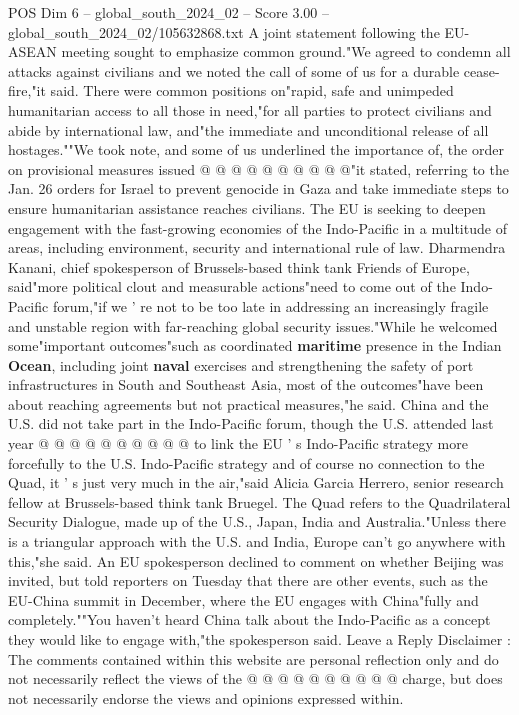 \begin{textsample}{POS Dim 6 – global\_south\_2024\_02 – Score 3.00 – global\_south\_2024\_02/105632868.txt}
A joint statement following the EU-ASEAN meeting sought to emphasize common ground."We agreed to condemn all attacks against civilians and we noted the call of some of us for a durable cease-fire,"it said.
There were common positions on"rapid, safe and unimpeded humanitarian access to all those in need,"for all parties to protect civilians and abide by international law, and"the immediate and unconditional release of all hostages.""We took note, and some of us underlined the importance of, the order on provisional measures issued @ @ @ @ @ @ @ @ @ @"it stated, referring to the Jan. 26 orders for Israel to prevent genocide in Gaza and take immediate steps to ensure humanitarian assistance reaches civilians.
The EU is seeking to deepen engagement with the fast-growing economies of the Indo-Pacific in a multitude of areas, including environment, security and international rule of law.
Dharmendra Kanani, chief spokesperson of Brussels-based think tank Friends of Europe, said"more political clout and measurable actions"need to come out of the Indo-Pacific forum,"if we ' re not to be too late in addressing an increasingly fragile and unstable region with far-reaching global security issues."While he welcomed some"important outcomes"such as coordinated \textbf{maritime} presence in the Indian \textbf{Ocean}, including joint \textbf{naval} exercises and strengthening the safety of port infrastructures in South and Southeast Asia, most of the outcomes"have been about reaching agreements but not practical measures,"he said.
China and the U.S. did not take part in the Indo-Pacific forum, though the U.S. attended last year @ @ @ @ @ @ @ @ @ @ to link the EU ' s Indo-Pacific strategy more forcefully to the U.S.
Indo-Pacific strategy and of course no connection to the Quad, it ' s just very much in the air,"said Alicia Garcia Herrero, senior research fellow at Brussels-based think tank Bruegel.
The Quad refers to the Quadrilateral Security Dialogue, made up of the U.S., Japan, India and Australia."Unless there is a triangular approach with the U.S. and India, Europe can't go anywhere with this,"she said.
An EU spokesperson declined to comment on whether Beijing was invited, but told reporters on Tuesday that there are other events, such as the EU-China summit in December, where the EU engages with China"fully and completely.""You haven't heard China talk about the Indo-Pacific as a concept they would like to engage with,"the spokesperson said.
Leave a Reply Disclaimer : The comments contained within this website are personal reflection only and do not necessarily reflect the views of the @ @ @ @ @ @ @ @ @ @ charge, but does not necessarily endorse the views and opinions expressed within.

\end{textsample}

